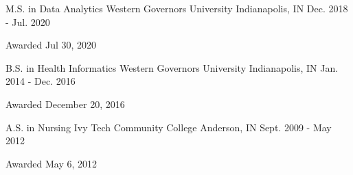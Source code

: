 
\begin{cventries}

  \cventry
    {M.S. in Data Analytics} %
    {Western Governors University} %
    {Indianapolis, IN} %
    {Dec. 2018 - Jul. 2020} %
    {
      \begin{cvitems} %
        \item {Awarded Jul 30, 2020}
      \end{cvitems}
    }

  \cventry
    {B.S. in Health Informatics} %
    {Western Governors University} %
    {Indianapolis, IN} %
    {Jan. 2014 - Dec. 2016} %
    {
      \begin{cvitems} %
        \item {Awarded December 20, 2016}
      \end{cvitems}
    }


  \cventry
    {A.S. in Nursing} %
    {Ivy Tech Community College} %
    {Anderson, IN} %
    {Sept. 2009 - May 2012} %
    {
      \begin{cvitems} %
        \item {Awarded May 6, 2012}
      \end{cvitems}
    }

\end{cventries}

